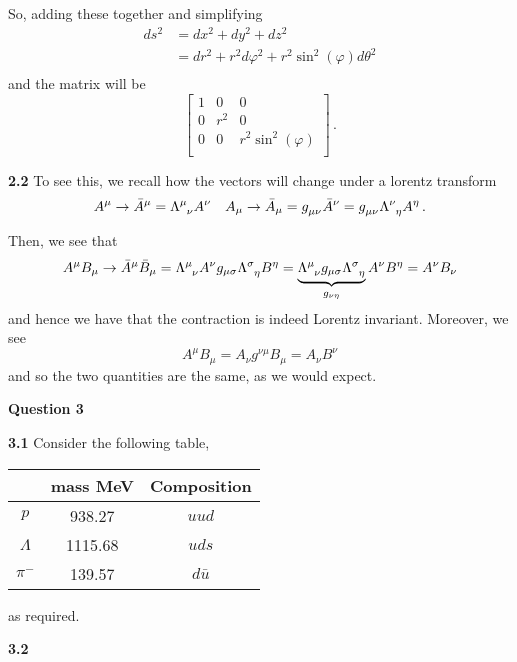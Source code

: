 \documentclass[10pt]{article}
\begin{document}
So, adding these together and simplifying
\begin{equation*}
  \begin{split}
    ds^{2} & = dx^{2} + dy^{2} + dz^{2} \\
    & = dr^{2} + r^{2}d\varphi^{2} + r^{2}\sin^{2}(\varphi)d\theta^{2} \\
  \end{split}  
\end{equation*}
and the matrix will be
\[
\begin{bmatrix}
  1 & 0 & 0 \\
  0 & r^{2} & 0 \\
  0 & 0 & r^{2}\sin^{2}(\varphi) \\
\end{bmatrix}
\, .
\]

\textbf{2.2} To see this, we recall how the vectors will change under a lorentz transform
\[ A^{\mu} \to \bar{A}^{\mu} = \tensor{\Lambda}{^{\mu}_{\nu}}A^{\nu} \quad A_{\mu} \to \bar{A}_{\mu} = \tensor{g}{_{\mu\nu}}\bar{A}^{\nu} = \tensor{g}{_{\mu\nu}}\tensor{\Lambda}{^{\nu}_{\eta}}A^{\eta} \, .\]

Then, we see that
\[ A^{\mu}B_{\mu} \to \bar{A}^{\mu}\bar{B}_{\mu} = \tensor{\Lambda}{^{\mu}_{\nu}}A^{\nu}g_{\mu\sigma}\tensor{\Lambda}{^{\sigma}_{\eta}}B^{\eta} = \underbrace{\tensor{\Lambda}{^{\mu}_{\nu}}g_{\mu\sigma}\tensor{\Lambda}{^{\sigma}_{\eta}}}_{g_{\nu\eta}}A^{\nu}B^{\eta} = A^{\nu}B_{\nu}\]
and hence we have that the contraction is indeed Lorentz invariant. Moreover, we see
\[ A^{\mu}B_{\mu} = A_{\nu}g^{\nu\mu}B_{\mu} = A_{\nu}B^{\nu} \]
and so the two quantities are the same, as we would expect. 

\textbf{Question 3}

\textbf{3.1} Consider the following table,
\begin{table}[h]
  \centering
  \begin{tabular}{|c|c|c|}
    \hline
     & \textbf{mass MeV} & \textbf{Composition} \\
    \hline
    $p$ & 938.27 & $uud$ \\
    \hline
    $\Lambda$ & 1115.68 & $uds$ \\
    \hline
    $\pi^{-}$ & 139.57 & $d\bar{u}$ \\
    \hline
  \end{tabular}
\end{table}
as required.

\textbf{3.2}
\end{document}
